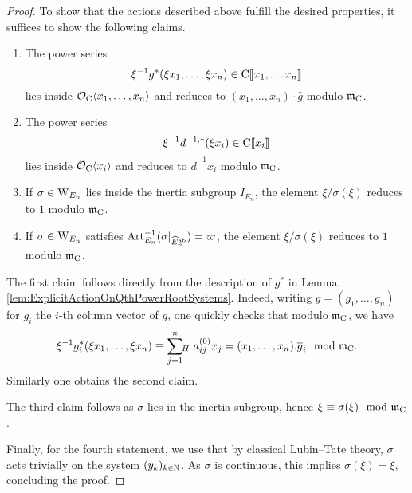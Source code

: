 \documentclass[../main.tex]{subfiles}
\begin{document}
\begin{proof}
To show that the actions described above fulfill the desired properties, it suffices
to show the following claims.
\begin{enumerate}
  \item The power series 
    $$\xi^{-1}g^*(\xi x_1, \dots, \xi x_n) \in {\mathrm{C}}\llbracket x_1, \dots x_n \rrbracket$$
    lies inside $\mathcal{O}_{\mathrm{C}} \langle x_1, \dots, x_n \rangle$ and reduces to $(x_1,
    \dots, x_n)\cdot \bar g$ modulo $\mathfrak{m}_{\mathrm{C}}$.
  \item The power series 
    \begin{equation*}
      \xi^{-1} d^{-1, *} (\xi x_i) \in {\mathrm{C}} \llbracket x_i\rrbracket 
    \end{equation*}
    lies inside $\mathcal{O}_{\mathrm{C}} \langle x_i \rangle$ and reduces to $\bar d^{-1} x_i$
    modulo $\mathfrak{m}_{\mathrm{C}}$. 
  \item If $\sigma \in \mathrm W_{E_n}$ lies inside the inertia subgroup $I_{E_n}$,
    the element
    $\xi/\sigma(\xi)$ reduces to $1$ modulo $\mathfrak{m}_{\mathrm{C}}$.
  \item If $\sigma \in \mathrm W_{E_n}$ satisfies $\mathrm{Art}^{-1}_{E_n}(\sigma|_{\widehat
    E_n^{\mathrm{ab}}}) = \varpi$, the element
    $\xi/\sigma(\xi)$ reduces to $1$ modulo $\mathfrak{m}_{\mathrm{C}}$. 
\end{enumerate}
The first claim follows directly from the description of $g^*$ in
Lemma \ref{lem:ExplicitActionOnQthPowerRootSystems}. Indeed, writing $g = (g_1,
\dots, g_n)$ for $g_i$ the $i$-th column vector of $g$, one quickly checks that modulo
$\mathfrak{m}_{\mathrm{C}}$, we have 
$$\xi^{-1} g_i^*(\xi x_1, \dots, \xi x_n) \equiv \sum_{j=1}^n {\hspace{-3pt}}_H\hspace{3pt}
a_{ij}^{(0)} x_j = (x_1, \dots, x_n).\overline g_i \mod {\mathfrak{m}}_{\mathrm{C}}.$$ 
Similarly one obtains the second claim.

The third claim follows as $\sigma$ lies in the inertia subgroup,
hence $\xi \equiv \sigma(\xi) \mod {\mathfrak{m}}_{\mathrm{C}}$.

Finally, for the fourth statement, we use that by classical Lubin--Tate theory, $\sigma$
acts trivially on the system
$(y_k)_{k\in \mathbb{N}}$. As $\sigma$ is continuous, this implies $\sigma(\xi) = \xi$,
concluding the proof.
\end{proof}
\end{document}
